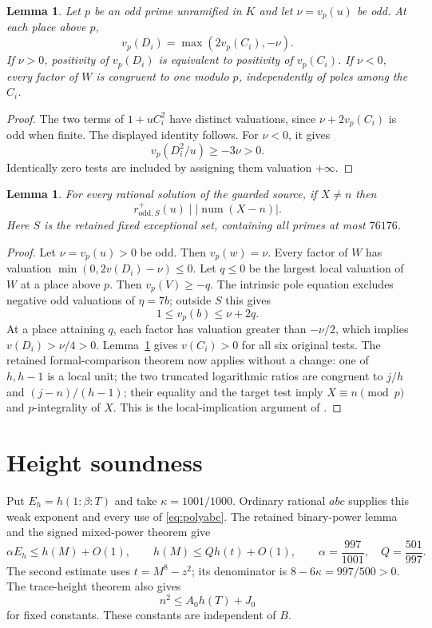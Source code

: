\documentclass[11pt,a4paper]{article}
\newtheorem{lemma}[theorem]{Lemma}
\begin{document}
\begin{lemma}\label{lem:balanced}
Let $p$ be an odd prime unramified in $K$ and let $\nu=v_p(u)$ be odd.
At each place above $p$,
\[
                  v_p(D_i)=\max(2v_p(C_i),-\nu).
\]
If $\nu>0$, positivity of $v_p(D_i)$ is equivalent to positivity of
$v_p(C_i)$. If $\nu<0$, every factor of $W$ is congruent to one
modulo $p$, independently of poles among the $C_i$.
\end{lemma}
\begin{proof}
The two terms of $1+uC_i^2$ have distinct valuations, since
$\nu+2v_p(C_i)$ is odd when finite. The displayed identity follows.
For $\nu<0$, it gives
\[
                v_p(D_i^2/u)\ge-3\nu>0.
\]
Identically zero tests are included by assigning them valuation
$+\infty$.
\end{proof}

\begin{lemma}\label{lem:extract}
For every rational solution of the guarded source, if $X\ne n$ then
\[
              r^+_{\mathrm{odd},S}(u)\mid |\operatorname{num}(X-n)|.
\]
Here $S$ is the retained fixed exceptional set, containing all primes
at most $76176$.
\end{lemma}
\begin{proof}
Let $\nu=v_p(u)>0$ be odd. Then $v_p(w)=\nu$.
Every factor of $W$ has valuation
$\min(0,2v(D_i)-\nu)\le0$. Let $q\le0$ be the largest local
valuation of $W$ at a place above $p$. Then $v_p(V)\ge-q$.
The intrinsic pole equation excludes negative odd valuations of
$\eta=7b$; outside $S$ this gives
\[
                    1\le v_p(b)\le\nu+2q.
\]
At a place attaining $q$, each factor has valuation greater than
$-\nu/2$, which implies $v(D_i)>\nu/4>0$.
Lemma~\ref{lem:balanced} gives $v(C_i)>0$ for all six original tests.
The retained formal-comparison theorem now applies without a change:
one of $h,h-1$ is a local unit; the two truncated logarithmic ratios
are congruent to $j/h$ and $(j-n)/(h-1)$; their equality and the
target test imply $X\equiv n\pmod p$ and $p$-integrality of $X$.
This is the local-implication argument of \cite[Section 4]{Conditional}.
\end{proof}

\section{Height soundness}

Put $E_h=h(1:\beta:T)$ and take $\kappa=1001/1000$.
Ordinary rational $abc$ supplies this weak exponent and every use of
\eqref{eq:polyabc}. The retained binary-power lemma and the signed
mixed-power theorem \cite{Signed} give
\begin{equation}\label{eq:rootbounds}
 \alpha E_h\le h(M)+O(1),\qquad
 h(M)\le Qh(t)+O(1),\qquad
 \alpha=\frac{997}{1001},\quad Q=\frac{501}{997}.
\end{equation}
The second estimate uses $t=M^8-z^2$; its denominator is
$8-6\kappa=997/500>0$.
The trace-height theorem also gives
\[
                     n^2\le A_0h(T)+J_0
\]
for fixed constants. These constants are independent of $B$.
\end{document}

